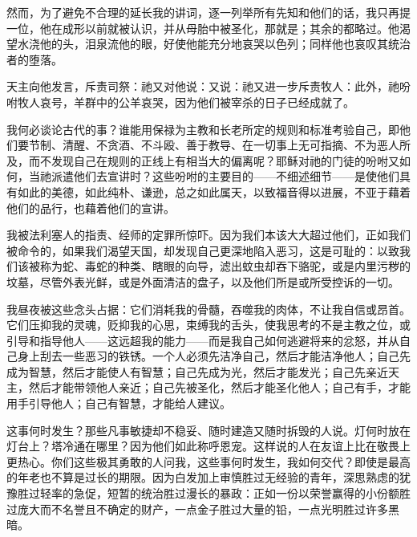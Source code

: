 然而，为了避免不合理的延长我的讲词，逐一列举所有先知和他们的话，我只再提一位，他在成形以前就被认识，并从母胎中被圣化，那就是；其余的都略过。他渴望水浇他的头，泪泉流他的眼，好使他能充分地哀哭以色列；同样他也哀叹其统治者的堕落。\par

天主向他发言，斥责司祭：祂又对他说：又说：祂又进一步斥责牧人：此外，祂吩咐牧人哀号，羊群中的公羊哀哭，因为他们被宰杀的日子已经成就了。\par

我何必谈论古代的事？谁能用保禄为主教和长老所定的规则和标准考验自己，即他们要节制、清醒、不贪酒、不斗殴、善于教导、在一切事上无可指摘、不为恶人所及，而不发现自己在规则的正线上有相当大的偏离呢？耶稣对祂的门徒的吩咐又如何，当祂派遣他们去宣讲时？这些吩咐的主要目的——不细述细节——是使他们具有如此的美德，如此纯朴、谦逊，总之如此属天，以致福音得以进展，不亚于藉着他们的品行，也藉着他们的宣讲。\par

我被法利塞人的指责、经师的定罪所惊吓。因为我们本该大大超过他们，正如我们被命令的，如果我们渴望天国，却发现自己更深地陷入恶习，这是可耻的：以致我们该被称为蛇、毒蛇的种类、瞎眼的向导，滤出蚊虫却吞下骆驼，或是内里污秽的坟墓，尽管外表光鲜，或是外面清洁的盘子，以及他们所是或所受控诉的一切。\par

我昼夜被这些念头占据：它们消耗我的骨髓，吞噬我的肉体，不让我自信或昂首。它们压抑我的灵魂，贬抑我的心思，束缚我的舌头，使我思考的不是主教之位，或引导和指导他人——这远超我的能力——而是我自己如何逃避将来的忿怒，并从自己身上刮去一些恶习的铁锈。一个人必须先洁净自己，然后才能洁净他人；自己先成为智慧，然后才能使人有智慧；自己先成为光，然后才能发光；自己先亲近天主，然后才能带领他人亲近；自己先被圣化，然后才能圣化他人；自己有手，才能用手引导他人；自己有智慧，才能给人建议。\par

这事何时发生？那些凡事敏捷却不稳妥、随时建造又随时拆毁的人说。灯何时放在灯台上？塔冷通在哪里？因为他们如此称呼恩宠。这样说的人在友谊上比在敬畏上更热心。你们这些极其勇敢的人问我，这些事何时发生，我如何交代？即使是最高的年老也不算是过长的期限。因为白发加上审慎胜过无经验的青年，深思熟虑的犹豫胜过轻率的急促，短暂的统治胜过漫长的暴政：正如一份以荣誉赢得的小份额胜过庞大而不名誉且不确定的财产，一点金子胜过大量的铅，一点光明胜过许多黑暗。\par

